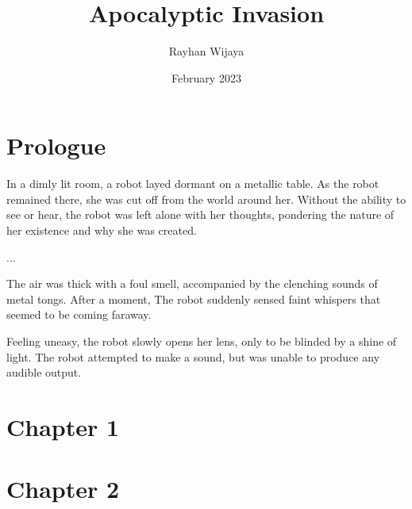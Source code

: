 \documentclass[12pt]{book}
\title{Apocalyptic Invasion}
\author{Rayhan Wijaya}
\date{February 2023}
\begin{document}
\maketitle

\section*{Prologue}

In a dimly lit room, a robot layed dormant on a metallic table. As the robot
remained there, she was cut off from the world around her. Without the ability
to see or hear, the robot was left alone with her thoughts, pondering the
nature of her existence and why she was created.

...

The air was thick with a foul smell, accompanied by the clenching sounds of
metal tongs. After a moment, The robot suddenly sensed faint whispers that
seemed to be coming faraway.

Feeling uneasy, the robot slowly opens her lens, only to be blinded by a shine
of light. The robot attempted to make a sound, but was unable to produce any
audible output.

\section*{Chapter 1}

\section*{Chapter 2}
\end{document}
